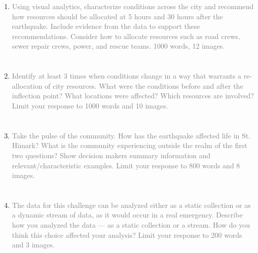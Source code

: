 \documentclass{article}
\begin{document}
\newpage
\begin{enumerate}
    \section*{\tiny} %
    \item \textcolor{gray}{Using  visual analytics, characterize conditions
        across the city and recommend how resources should be allocated at 5
        hours and 30 hours after the earthquake. Include evidence from the data
        to support these recommendations. Consider how to allocate resources
        such as road crews, sewer repair crews, power, and rescue teams. 1000
        words, 12 images.}

    
    \newpage

    \section*{\tiny} %
    \item \textcolor{gray}{Identify at least 3 times when conditions change in
        a way that warrants a re-allocation of city resources. What were the
        conditions before and after the inflection point? What locations were
        affected? Which resources are involved? Limit your response to 1000
        words and 10 images.}

    

    \section*{\tiny} %
    \item \textcolor{gray}{Take the pulse of the community.  How has the
        earthquake affected life in St. Himark? What is the community
        experiencing outside the realm of the first two questions? Show decision
        makers summary information and relevant/characteristic examples. Limit
        your response to 800 words and 8 images.}

    

    \section*{\tiny} %
    \item \textcolor{gray}{The data for this challenge can be analyzed either as
        a static collection or as a dynamic stream of data, as it would occur in
        a real emergency. Describe how you analyzed the data --- as a static
        collection or a stream. How do you think this choice affected your
        analysis? Limit your response to 200 words and 3 images.}

    
\end{enumerate}
\end{document}
